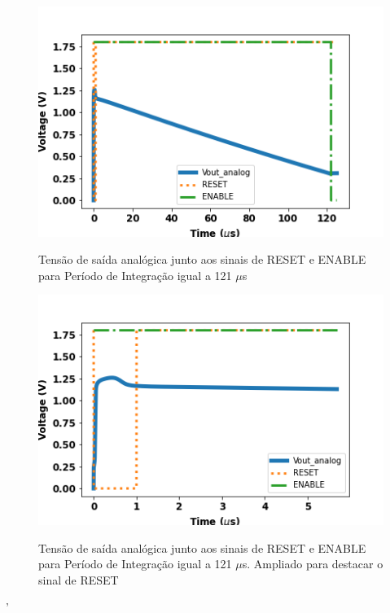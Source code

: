 \begin{figure}[!h]
 \centering
    \centering
    \caption{Tensão de saída analógica junto aos sinais de RESET e ENABLE para Período de Integração igual a 121 $\mu$s}
    \includegraphics[scale=0.6]{Resultados/Graficos/reseteenable-tb_pixel125.png}
    \label{graf125}
\end{figure}

\begin{figure}[!h]
 \centering
    \centering
    \caption{Tensão de saída analógica junto aos sinais de RESET e ENABLE para Período de Integração igual a 121 $\mu$s. Ampliado para destacar o sinal de RESET}
    \includegraphics[scale=0.6]{Resultados/Graficos/reseteenable-tb_pixel125_zoom.png}
    \label{graf125z}
\end{figure}'

